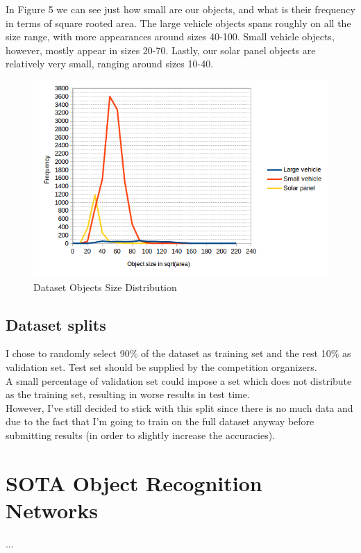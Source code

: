 \documentclass[]{article}
\begin{document}
In Figure 5 we can see just how small are our objects, and what is their frequency in terms of square rooted area. The large vehicle objects spans roughly on all the size range, with more appearances around sizes 40-100. Small vehicle objects, however, mostly appear in sizes 20-70. Lastly, our solar panel objects are relatively very small, ranging around sizes 10-40.
\begin{figure}[!h]
\centering
\includegraphics[width=0.7\linewidth]{"charts/Dataset Objects Size Distribution"}
\caption{Dataset Objects Size Distribution}
\label{fig:Dataset Objects Size Distribution}
\end{figure}

\subsection{Dataset splits}
I chose to randomly select 90\% of the dataset as training set and the rest 10\% as validation set. Test set should be supplied by the competition organizers.\\
A small percentage of validation set could impose a set which does not distribute as the training set, resulting in worse results in test time.\\
However, I've still decided to stick with this split since there is no much data and due to the fact that I'm going to train on the full dataset anyway before submitting results (in order to slightly increase the accuracies).

\section{SOTA Object Recognition Networks}
...
\end{document}
